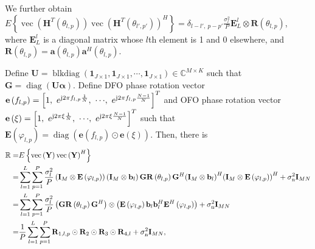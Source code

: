 \documentclass[12pt, draftclsnofoot, onecolumn]{IEEEtran}
\begin{document}
We further obtain $E \left\{ \operatorname{vec}\left( {{\mathbf{H}}^{T}}\left( {{\theta }_{l,p}} \right) \right)\operatorname{vec}{{\left( {{\mathbf{H}}^{T}}\left( {{\theta }_{l',p'}} \right) \right)}^{H}} \right\}
={{\delta }_{l-l', \!\ p-p'}}\frac{\sigma_{l}^{2} }{P}{{\mathbf{E}}_{L}^{l}}\otimes \mathbf{R}\left( {{\theta }_{l,p}} \right)$, where ${{\mathbf{E}}_{L}^{l}}$ is a diagonal matrix whose $l$th element is 1 and 0 elsewhere, and $\mathbf{R}\left( {{\theta }_{l,p}} \right)=\mathbf{a}\left( {{\theta }_{l,p}} \right){{\mathbf{a}}^{H}}\left( {{\theta }_{l,p}} \right)$.

Define $\mathbf{U}=\operatorname{blkdiag}\left( {{\mathbf{1}}_{J\times1}}, {{\mathbf{1}}_{J\times1}}, \cdots\!, {{\mathbf{1}}_{J\times1}} \right)\in {{\mathbb{C}}^{M\times K}}$ such that $\mathbf{G} = \operatorname{diag} \left({\mathbf{U}}{\boldsymbol\alpha}\right)$. Define DFO phase rotation vector $\mathbf{e}\left( {{f}_{l,p}} \right) =\left[ 1,\ {{e}^{\text{j}2{\rm\pi} {{f}_{l,p}}\frac{1}{N}}},\ \cdots\!, \ {{e}^{\text{j}2{\rm\pi} {{f }_{l,p}}\frac{N-1}{N}}} \right]^{T}$ and OFO phase rotation vector $\mathbf{e}\left( {\xi} \right) =\left[ 1,\ {{e}^{\text{j}2{\rm\pi} {\xi}\frac{1}{N}}},\ \cdots\!, \ {{e}^{\text{j}2{\rm\pi} {\xi}\frac{N-1}{N}}} \right]^{T}$ such that $\mathbf{E}\left( {{\varphi }_{l,p}} \right) = \operatorname{diag}\left( \mathbf{e}\left( {{f}_{l,p}} \right) \odot {\mathbf{e}}\left( {\xi} \right) \right)$.
Then, there is
\begin{align}{\label{R}}
 \mathbb{R}= & E\left\{ \operatorname{vec}\left( \mathbf{Y} \right)\operatorname{vec}{{\left( \mathbf{Y} \right)}^{H}} \right\} \nonumber \\
 =&\sum\limits_{l=1}^{L} {\sum\limits_{p=1}^{P}{ \frac{{\sigma_{l}^{2}} }{P} \left( {{\mathbf{I}}_{M}}\otimes \mathbf{E}\left( {{\varphi }_{l,p}} \right) \right)\left( {{\mathbf{I}}_{M}}\otimes {{\mathbf{b}}_{{l}}} \right)\mathbf{G} \mathbf{R}\left( {{\theta }_{l,p}} \right){{\mathbf{G}}^{H}}}} {{\left( {{\mathbf{I}}_{M}}\otimes {{\mathbf{b}}_{{l}}} \right)}^{H}}{{\left( {{\mathbf{I}}_{M}}\otimes \mathbf{E}\left( {{\varphi }_{l,p}} \right) \right)}^{H}}+{{\sigma }_{\mathrm{n}}^{2}}{{\mathbf{I}}_{MN}} \nonumber \\
 =& \sum\limits_{l=1}^{L}{\sum\limits_{p=1}^{P}{ \frac{{\sigma_{l}^{2}} }{P} \left( \mathbf{GR}\left( {{\theta }_{l,p}} \right){{\mathbf{G}}^{H}} \right)\otimes \left( \mathbf{E}\left( {{\varphi }_{l,p}} \right){{\mathbf{b}}_{{l}}}\mathbf{b}_{{l}}^{H}{{\mathbf{E}}^{H}}\left( {{\varphi }_{l,p}} \right) \right)}} +{{\sigma }_{\mathrm{n}}^{2}}{{\mathbf{I}}_{MN}} \nonumber \\
 =& \frac{1}{P}\sum\limits_{l=1}^{L}{\sum\limits_{p=1}^{P}{{{\mathbf{R}}_{1,l,p}}\odot {{\mathbf{R}}_{2}}\odot {{\mathbf{R}}_{3}}\odot {{\mathbf{R}}_{4,l}}}}+{{\sigma }_{\mathrm{n}}^{2}}{{\mathbf{I}}_{MN}},
\end{align}
\end{document}
